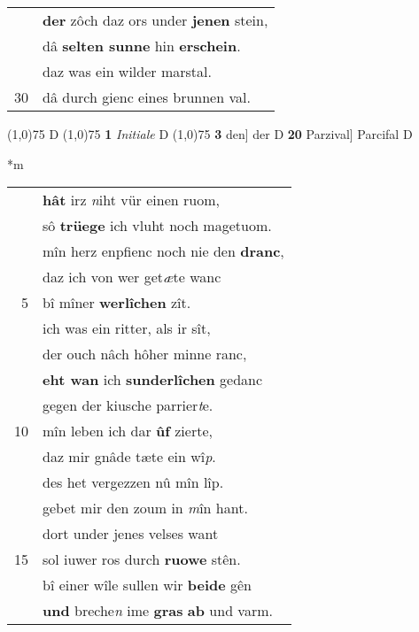 \documentclass[8pt,a4paper,notitlepage]{article}
\begin{document}
\begin{table}[ht]
\begin{minipage}[t]{0.5\linewidth}
\begin{tabular}{rl}
 & \textbf{der} zôch daz ors under \textbf{jenen} stein,\\ 
 & dâ \textbf{selten sunne} hin \textbf{erschein}.\\ 
 & daz was ein wilder marstal.\\ 
30 & dâ durch gienc eines brunnen val.\\ 
\end{tabular}
\scriptsize
\line(1,0){75} \newline
D \newline
\line(1,0){75} \newline
\textbf{1} \textit{Initiale} D  \newline
\line(1,0){75} \newline
\textbf{3} den] der D \textbf{20} Parzival] Parcifal D \newline
\end{minipage}
\hspace{0.5cm}
\begin{minipage}[t]{0.5\linewidth}
\small
\begin{center}*m
\end{center}
\begin{tabular}{rl}
 & \textbf{hât} irz \textit{n}iht vür einen ruom,\\ 
 & sô \textbf{trüege} ich vluht noch magetuom.\\ 
 & mîn herz enpfienc noch nie den \textbf{dranc},\\ 
 & daz ich von wer get\textit{æ}te wanc\\ 
5 & bî mîner \textbf{werlîchen} zît.\\ 
 & ich was ein ritter, als ir sît,\\ 
 & der ouch nâch hôher minne ranc,\\ 
 & \textbf{eht wan} ich \textbf{sunderlîchen} gedanc\\ 
 & gegen der kiusche parrier\textit{t}e.\\ 
10 & mîn leben ich dar \textbf{ûf} zierte,\\ 
 & daz mir gnâde tæte ein wî\textit{p}.\\ 
 & des het vergezzen nû mîn lîp.\\ 
 & gebet mir den zoum in \textit{m}în hant.\\ 
 & dort under jenes velses want\\ 
15 & sol iuwer ros durch \textbf{ruowe} stên.\\ 
 & bî einer wîle sullen wir \textbf{beide} gên\\ 
 & \textbf{und} breche\textit{n} ime \textbf{gras} \textbf{ab} und varm.\\ 

\end{tabular}
\end{minipage}
\end{table}
\end{document}
